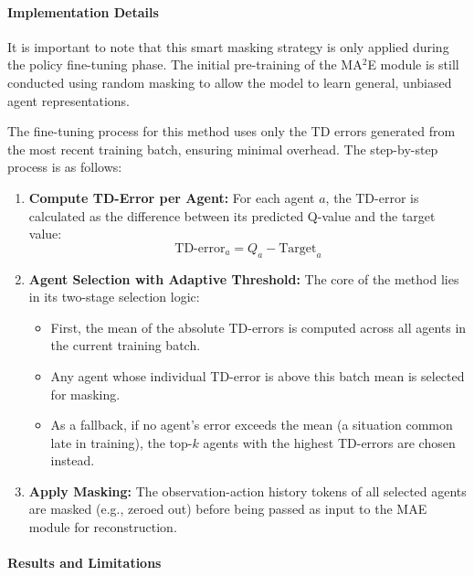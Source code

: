 \paragraph{Implementation Details}
It is important to note that this smart masking strategy is only applied during the policy fine-tuning phase. The initial pre-training of the MA$^2$E module is still conducted using random masking to allow the model to learn general, unbiased agent representations.

The fine-tuning process for this method uses only the TD errors generated from the most recent training batch, ensuring minimal overhead. The step-by-step process is as follows:
\begin{enumerate}
    \item \textbf{Compute TD-Error per Agent:} For each agent $a$, the TD-error is calculated as the difference between its predicted Q-value and the target value:
    \begin{equation}
        \label{eq:td_error_simple}
        \text{TD-error}_a = Q_a - \text{Target}_a
    \end{equation}

    \item \textbf{Agent Selection with Adaptive Threshold:} The core of the method lies in its two-stage selection logic:
    \begin{itemize}
        \item First, the mean of the absolute TD-errors is computed across all agents in the current training batch.
        \item Any agent whose individual TD-error is above this batch mean is selected for masking.
        \item As a fallback, if no agent's error exceeds the mean (a situation common late in training), the top-$k$ agents with the highest TD-errors are chosen instead.
    \end{itemize}

    \item \textbf{Apply Masking:} The observation-action history tokens of all selected agents are masked (e.g., zeroed out) before being passed as input to the MAE module for reconstruction.
\end{enumerate}
\paragraph{Results and Limitations}

